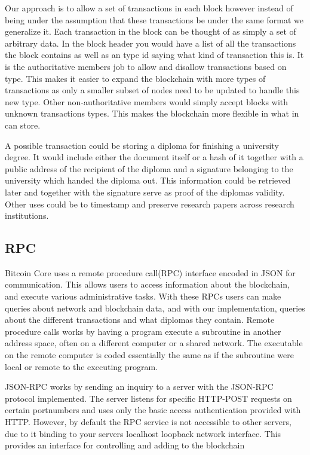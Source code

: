 \documentclass[11pt]{article}
\begin{document}
Our approach is to allow a set of transactions in each block however instead of being under the assumption that these transactions be under the same format we generalize it. Each transaction in the block can be thought of as simply a set of arbitrary data. In the block header you would have a list of all the transactions the block contains as well as an type id saying what kind of transaction this is. It is the authoritative members job to allow and disallow transactions based on type. This makes it easier to expand the blockchain with more types of transactions as only a smaller subset of nodes need to be updated to handle this new type. Other non-authoritative members would simply accept blocks with unknown transactions types. This makes the blockchain more flexible in what in can store.


A possible transaction could be storing a diploma for finishing a university degree. It would include either the document itself or a hash of it together with a public address of the recipient of the diploma and a signature belonging to the university which handed the diploma out. This information could be retrieved later and together with the signature serve as proof of the diplomas validity. Other uses could be to timestamp and preserve research papers across research institutions. 


\subsection{RPC}
Bitcoin Core uses a remote procedure call(RPC) interface encoded in JSON for communication. This allows users to access information about the blockchain, and execute various administrative tasks. With these RPCs users can make queries about network and blockchain data, and with our implementation, queries about the different transactions and what diplomas they contain. Remote procedure calls works by having a program execute a subroutine in another address space, often on a different computer or a shared network. The executable on the remote computer is coded essentially the same as if the subroutine were local or remote to the executing program. 

JSON-RPC works by sending an inquiry to a server with the JSON-RPC protocol implemented. The server listens for specific HTTP-POST requests on certain portnumbers and uses only the basic access authentication provided with HTTP. However, by default the RPC service is not accessible to other servers, due to it binding to your servers localhost loopback network interface. This provides an interface for controlling and adding to the blockchain

\newpage
 

\listoffigures
\end{document}
